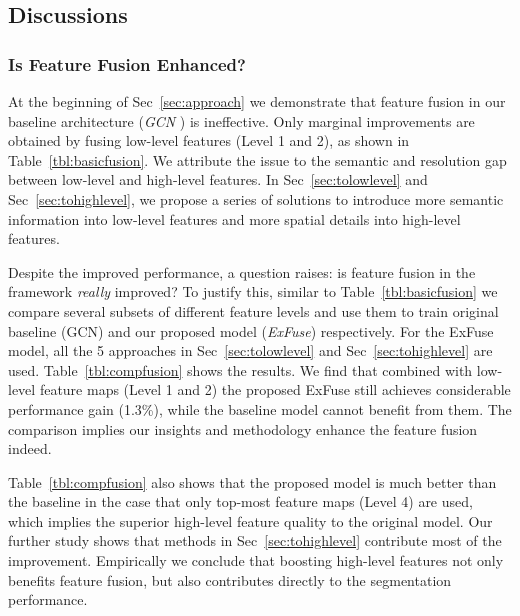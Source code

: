 \documentclass[runningheads]{llncs}
\begin{document}
\subsection{Discussions}

\subsubsection{Is Feature Fusion Enhanced?}
At the beginning of Sec~\ref{sec:approach} we demonstrate that feature fusion in our baseline architecture (\emph{GCN} \cite{Peng2017Large}) is ineffective. Only marginal improvements are obtained by fusing low-level features (Level 1 and 2), as shown in Table~\ref{tbl:basicfusion}. We attribute the issue to the semantic and resolution gap between low-level and high-level features. In Sec~\ref{sec:tolowlevel} and Sec~\ref{sec:tohighlevel}, we propose a series of solutions to introduce more semantic information into low-level features and more spatial details into high-level features. 

Despite the improved performance, a question raises: is feature fusion in the framework \emph{really} improved? To justify this, similar to Table~\ref{tbl:basicfusion} we compare several subsets of different feature levels and use them to train original baseline (GCN) and our proposed model (\emph{ExFuse}) respectively. For the ExFuse model, all the 5 approaches in Sec~\ref{sec:tolowlevel} and Sec~\ref{sec:tohighlevel} are used. Table~\ref{tbl:compfusion} shows the results. We find that combined with low-level feature maps (Level 1 and 2) the proposed ExFuse still achieves considerable performance gain (1.3\%), while the baseline model cannot benefit from them. The comparison implies our insights and methodology enhance the feature fusion indeed.

Table~\ref{tbl:compfusion} also shows that the proposed model is much better than the baseline in the case that only top-most feature maps (Level 4) are used, which implies the superior high-level feature quality to the original model. Our further study shows that methods in Sec~\ref{sec:tohighlevel} contribute most of the improvement. Empirically we conclude that boosting high-level features not only benefits feature fusion, but also contributes directly to the segmentation performance.
\end{document}
